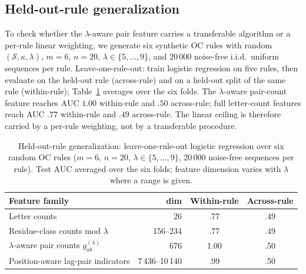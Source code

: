 \documentclass{article} %
\theoremstyle{plain}
\theoremstyle{definition}
\theoremstyle{remark}
\begin{document}
\subsection{Held-out-rule generalization}
\label{appendix:heldout}
To check whether the $\lambda$-aware pair feature carries a transferable algorithm or a per-rule linear weighting, we generate six synthetic OC rules with random $(\mathcal{S}, \kappa, \lambda)$, $m=6$, $n=20$, $\lambda\in\{5,\ldots,9\}$, and $20\,000$ noise-free i.i.d.\ uniform sequences per rule. Leave-one-rule-out: train logistic regression on five rules, then evaluate on the held-out rule (across-rule) and on a held-out split of the same rule (within-rule); Table~\ref{tab:heldout} averages over the six folds. The $\lambda$-aware pair-count feature reaches AUC $1.00$ within-rule and $.50$ across-rule; full letter-count features reach AUC $.77$ within-rule and $.49$ across-rule. The linear ceiling is therefore carried by a per-rule weighting, not by a transferable procedure.

\begin{table}[h]
\centering\small
\caption{Held-out-rule generalization: leave-one-rule-out logistic regression over six random OC rules ($m=6$, $n=20$, $\lambda\in\{5,\ldots,9\}$, $20\,000$ noise-free sequences per rule). Test AUC averaged over the six folds; feature dimension varies with $\lambda$ where a range is given.}
\label{tab:heldout}
\begin{tabular}{@{}lrcc@{}}
\toprule
Feature family & dim & Within-rule & Across-rule \\
\midrule
Letter counts & 26 & .77 & .49 \\
Residue-class counts mod $\lambda$ & 156--234 & .77 & .49 \\
$\lambda$-aware pair counts $g_{ab}^{(\lambda)}$ & 676 & 1.00 & .50 \\
Position-aware lag-pair indicators & 7\,436--10\,140 & .99 & .50 \\
\bottomrule
\end{tabular}
\end{table}
\end{document}
